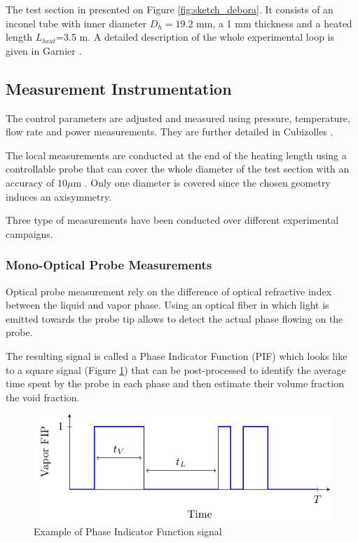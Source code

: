 The test section in presented on Figure \ref{fig:sketch_debora}. It consists of an inconel tube with inner diameter $D_{h}=19.2$ mm, a 1 mm thickness and a heated length $L_{heat}$=3.5 m. A detailed description of the whole experimental loop is given in Garnier \etal \cite{garnier_local_2001}.

\subsection{Measurement Instrumentation}

The control parameters are adjusted and measured using pressure, temperature, flow rate and power measurements. They are further detailed in Cubizolles \cite{cubizolles_etude_1996}.

\npar

The local measurements are conducted at the end of the heating length using a controllable probe that can cover the whole diameter of the test section with an accuracy of $10 \mu$m . Only one diameter is covered since the chosen geometry induces an axisymmetry.

Three type of measurements have been conducted over different experimental campaigns.

\subsubsection{Mono-Optical Probe Measurements}


Optical probe measurement rely on the difference of optical refractive index between the liquid and vapor phase. Using an optical fiber in which light is emitted towards the probe tip allows to detect the actual phase flowing on the probe. 

\npar

The resulting signal is called a Phase Indicator Function (PIF) which looks like to a square signal (Figure \ref{fig:FIP}) that can be post-processed to identify the average time spent by the probe in each phase and then estimate their volume fraction \eg the void fraction. 


\begin{figure}[!h]
\centering
\includegraphics[width=0.65\linewidth]{img/DEBORA/FIP.pdf}
\caption{Example of Phase Indicator Function signal}
\label{fig:FIP}
\end{figure}



